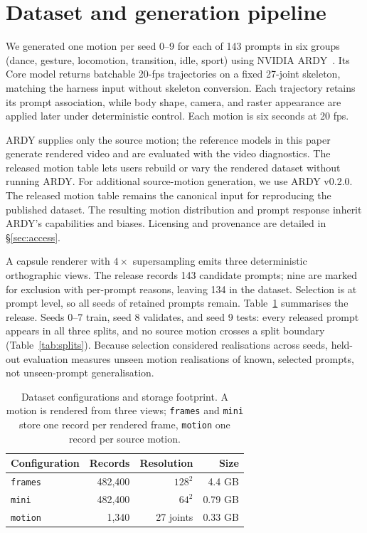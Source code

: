 \documentclass[10pt,twocolumn,letterpaper]{article}
\begin{document}
\section{Dataset and generation pipeline}\label{sec:data}
We generated one motion per seed 0--9 for each of 143 prompts in six groups (dance, gesture, locomotion,
transition, idle, sport) using NVIDIA ARDY~\cite{zhao2026ardy}. Its Core model returns batchable 20-fps
trajectories on a fixed 27-joint skeleton, matching the harness input without skeleton conversion. Each
trajectory retains its prompt association, while body shape, camera, and raster appearance are applied
later under deterministic control. Each motion is six seconds at 20 fps.

ARDY supplies only the source motion; the reference models in this paper generate rendered video and are
evaluated with the video diagnostics. The released motion table lets users rebuild or vary the rendered
dataset without running ARDY. For additional source-motion generation, we use ARDY v0.2.0. The released motion table remains the canonical input for
reproducing the published dataset. The resulting motion distribution and prompt response inherit ARDY's
capabilities and biases. Licensing and provenance are detailed in \S\ref{sec:access}.

A capsule renderer with $4\times$ supersampling emits three deterministic orthographic views.
The release records 143 candidate prompts; nine are marked for exclusion with per-prompt reasons, leaving
134 in the dataset. Selection is at prompt level, so all seeds of retained prompts remain. Table~\ref{tab:data} summarises the release. Seeds 0--7 train, seed
8 validates, and seed 9 tests: every released prompt appears in all three splits, and no source motion
crosses a split boundary (Table~\ref{tab:splits}). Because selection considered realisations across seeds,
held-out evaluation measures unseen motion realisations of known, selected prompts, not unseen-prompt
generalisation.

\begin{table}[t]\centering\caption{Dataset configurations and storage footprint. A motion is rendered from three views; \texttt{frames} and
\texttt{mini} store one record per rendered frame, \texttt{motion} one record per source
motion.}\label{tab:data}\small
\begin{tabular}{@{}lrrr@{}}\toprule Configuration & Records & Resolution & Size \\\midrule
\texttt{frames} & 482,400 & $128^2$ & 4.4 GB \\
\texttt{mini} & 482,400 & $64^2$ & 0.79 GB \\
\texttt{motion} & 1,340 & 27 joints & 0.33 GB \\\bottomrule\end{tabular}\end{table}
\end{document}
